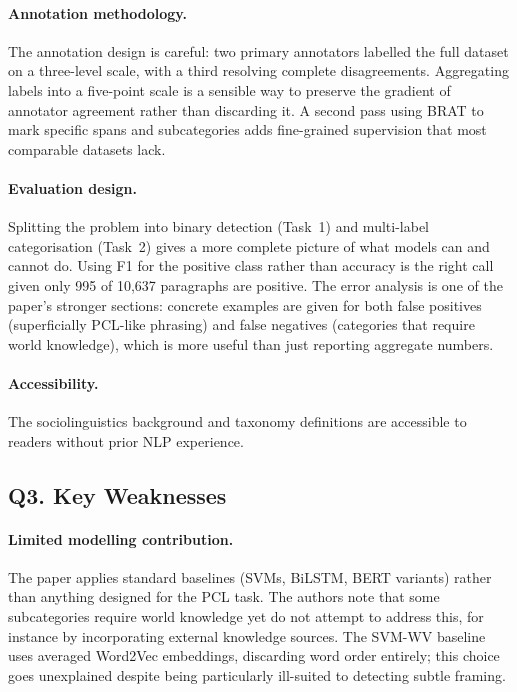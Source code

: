 \documentclass[11pt,a4paper]{article}
\begin{document}
\paragraph{Annotation methodology.} The annotation design is careful: two primary annotators labelled the full dataset on a three-level scale, with a third resolving complete disagreements. Aggregating labels into a five-point scale is a sensible way to preserve the gradient of annotator agreement rather than discarding it. A second pass using BRAT to mark specific spans and subcategories adds fine-grained supervision that most comparable datasets lack.

\paragraph{Evaluation design.} Splitting the problem into binary detection (Task~1) and multi-label categorisation (Task~2) gives a more complete picture of what models can and cannot do. Using F1 for the positive class rather than accuracy is the right call given only 995 of 10,637 paragraphs are positive. The error analysis is one of the paper's stronger sections: concrete examples are given for both false positives (superficially PCL-like phrasing) and false negatives (categories that require world knowledge), which is more useful than just reporting aggregate numbers.

\paragraph{Accessibility.} The sociolinguistics background and taxonomy definitions are accessible to readers without prior NLP experience.

\subsection*{Q3. Key Weaknesses}

\paragraph{Limited modelling contribution.} The paper applies standard baselines (SVMs, BiLSTM, BERT variants) rather than anything designed for the PCL task. The authors note that some subcategories require world knowledge yet do not attempt to address this, for instance by incorporating external knowledge sources. The SVM-WV baseline uses averaged Word2Vec embeddings, discarding word order entirely; this choice goes unexplained despite being particularly ill-suited to detecting subtle framing.
\end{document}

